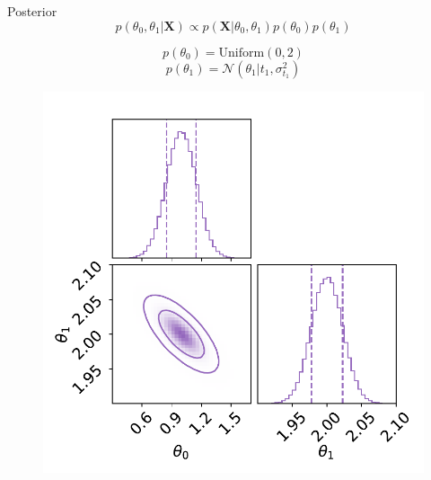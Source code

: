 \documentclass[
aspectratio=169,
14pt,
professionalfonts
]{beamer}
\begin{document}
\begin{frame}{Posterior}
\vspace{-1cm}
    $$p(\theta_0, \theta_1|\boldsymbol{X}) \propto p(\boldsymbol{X}|\theta_0, \theta_1) p(\theta_0)p(\theta_1)$$
    \begin{minipage}{0.4\linewidth}
        $$p(\theta_0) = \text{Uniform}(0,2)$$
        $$p(\theta_1) = \mathcal{N}(\theta_1 | t_1, \sigma_{t_1}^2)$$
    \end{minipage}
    \begin{minipage}{0.59\linewidth}
    \begin{figure}
        \centering
        \includegraphics[width=0.8\linewidth]{../plots/posterior.pdf}
    \end{figure}
    \end{minipage}
\end{frame}
\end{document}
